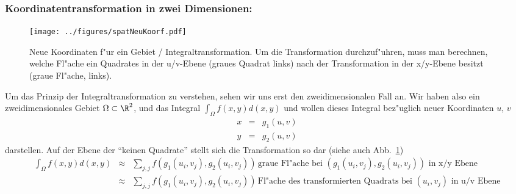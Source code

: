  \subsubsection{Koordinatentransformation in zwei Dimensionen:}\par
\begin{figure}[htbp] %
   \centering
   \texttt{[image: ../figures/spatNeuKoorf.pdf]} 
   \caption{Neue Koordinaten f"ur ein Gebiet / Integraltransformation.  
Um die Transformation durchzuf"uhren, muss man berechnen, welche Fl"ache ein Quadrates in der u/v-Ebene (graues Quadrat links) nach der Transformation 
in der x/y-Ebene besitzt (graue Fl"ache, links). }
   \label{neueKoord}
\end{figure}
Um das Prinzip der Integraltransformation zu verstehen,  sehen wir 
uns erst den zweidimensionalen Fall an. Wir haben also ein zweidimensionales Gebiet 
$\Omega\subset\R^2$, und das Integral $\int_\Omega f(x,y)d(x,y)$ und wollen 
dieses Integral bez"uglich neuer Koordinaten $u$, $v$
 \begin{eqnarray*}
 x & = & g_1(u,v)\\
 y & = & g_2(u,v)
 \end{eqnarray*}
darstellen. Auf der Ebene der ``keinen Quadrate'' stellt sich die Transformation so dar (siehe auch Abb.~\ref{neueKoord})
\begin{eqnarray*}
 \int_\Omega f(x,y)d(x,y)
&\approx& \sum_{j,j} f(g_1(u_i,v_j), g_2(u_i,v_j))\,
\mbox{graue Fl"ache bei } (g_1(u_i,v_j), g_2(u_i,v_j))\mbox{ in x/y Ebene}\\
&\approx& \sum_{j,j} f(g_1(u_i,v_j), g_2(u_i,v_j))\,
\mbox{Fl"ache des transformierten Quadrats bei } (u_i,v_j) \mbox{ in u/v Ebene}
\end{eqnarray*}

